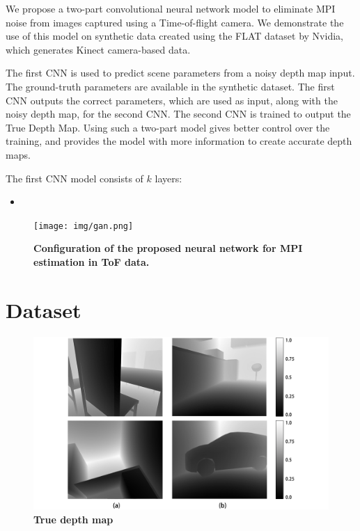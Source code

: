 \documentclass[a4paper, 11pt]{article}
\begin{document}
We propose a two-part convolutional neural network model to eliminate MPI noise from images captured using a Time-of-flight camera. 
We demonstrate the use of this model on synthetic data created using the FLAT dataset by Nvidia, which generates Kinect camera-based data. 

The first CNN is used to predict scene parameters from a noisy depth map input. 
The ground-truth parameters are available in the synthetic dataset. The first CNN outputs the correct parameters, which are used as input, along with the noisy depth map, for the second CNN. 
The second CNN is trained to output the True Depth Map. 
Using such a two-part model gives better control over the training, and provides the model with more information to create accurate depth maps.



The first CNN model consists of $k$ layers:

\begin{itemize}
    \item 
\end{itemize}



\begin{figure}
    \centering
    \texttt{[image: img/gan.png]}
    \caption{\textbf{Configuration of the proposed neural network for MPI estimation in ToF data.}}
    \label{fig:network_architecture}
\end{figure}




\section{Dataset}


\begin{figure}
    \centering
    \includegraphics[scale=0.35]{img/depthmap/raw.png}
    \caption{\textbf{True depth map}}
    \label{fig:result_raw}
\end{figure}
\end{document}

